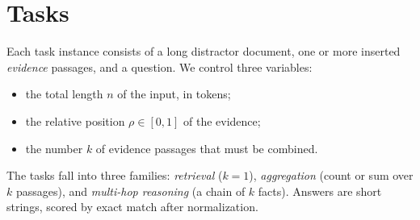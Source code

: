\section{Tasks}
\label{sec:tasks}

Each task instance consists of a long distractor document, one or more inserted \emph{evidence} passages, and a question. We control three variables:
\begin{itemize}
  \item the total length $n$ of the input, in tokens;
  \item the relative position $\rho \in [0, 1]$ of the evidence;
  \item the number $k$ of evidence passages that must be combined.
\end{itemize}

The tasks fall into three families: \emph{retrieval} ($k = 1$), \emph{aggregation} (count or sum over $k$ passages), and \emph{multi-hop reasoning} (a chain of $k$ facts). Answers are short strings, scored by exact match after normalization.
